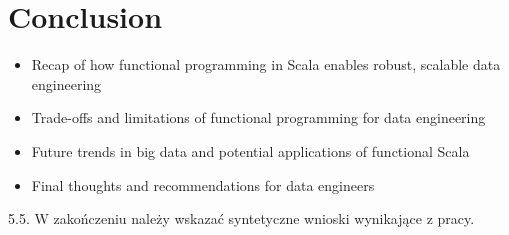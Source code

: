 \chapter{Conclusion}

\begin{itemize}
    \item Recap of how functional programming in Scala enables robust, scalable data engineering
    \item Trade-offs and limitations of functional programming for data engineering
    \item Future trends in big data and potential applications of functional Scala
    \item Final thoughts and recommendations for data engineers
\end{itemize}

5.5. W zakończeniu należy wskazać syntetyczne wnioski wynikające z pracy.